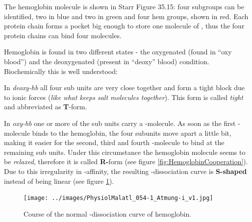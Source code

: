 
The hemoglobin molecule is shown in  Starr  Figure 35.15: four subgroups can be identified, two in blue and two in green and four hem groups, shown in red. Each protein chain forms a pocket big enough to store one molecule of  , thus the four protein chains can bind four   molecules.
%

 Hemoglobin is found in two different states - the oxygenated (found in "`oxy blood"') and the deoxygenated (present in "`deoxy"' blood) condition. Biochemically this is well understood:

 In \emph{deoxy-hb} all four sub units are very close together and form a tight block due to ionic forces (\textit{like what keeps salt molecules together}). This form is called \emph{tight} and abbreviated as \textbf{T}-form.

 In \emph{oxy-hb} one or more of the sub units carry a  -molecule. As soon as the first  -molecule binds to the hemoglobin, the four subunits move apart a little bit, making it easier for the second, third and fourth  -molecule to bind at the remaining sub units. Under this circumstance the hemoglobin molecule seems to be \emph{relaxed}, therefore it is called \textbf{R-}form (see figure \ref{fig:HemoglobinCooperation}). Due to this irregularity in  -affinity, the resulting   -dissociation curve is \textbf{S-shaped} instead of being linear (see figure \ref{fig:HbAffinitaetskurve}).


			\begin{figure}[htp]
		  \texttt{[image: ../images/PhysiolMalatl\_054-1\_Atmung-i\_v1.jpg]}
		  \caption[Hb Affinitätskurve aus Malatlas Physiol]{Course of the normal  -dissociation curve of hemoglobin.}
		\label{fig:HbAffinitaetskurve}
		\end{figure}


